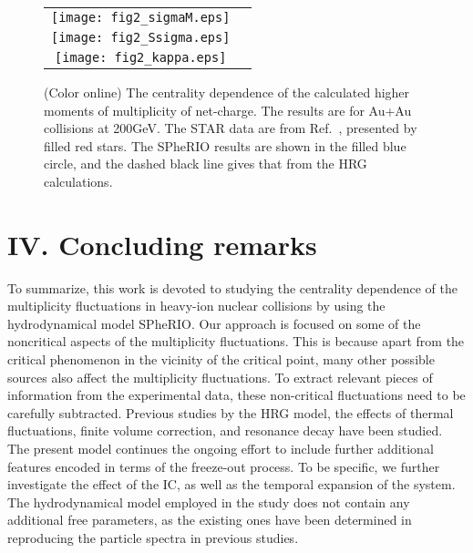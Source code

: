 \documentclass[secnumarabic, graphics,floatfix, nofootinbib,tightenlines,nobibnotes, aps, prl, 12pt]{revtex4-1}
\begin{document}
\begin{figure}[htb]
\begin{tabular}{cc}
\begin{minipage}{300pt}
\centerline{\texttt{[image: fig2\_sigmaM.eps]}}
\end{minipage}
\\
\begin{minipage}{300pt}
\centerline{\texttt{[image: fig2\_Ssigma.eps]}}
\end{minipage}
\\
\begin{minipage}{300pt}
\centerline{\texttt{[image: fig2\_kappa.eps]}}
\end{minipage}
\end{tabular}
\caption{(Color online) The centrality dependence of the calculated higher moments of multiplicity of net-charge.
The results are for Au+Au collisions at 200GeV. 
The STAR data are from Ref.~\cite{RHIC-star-mul-fluctuations-04}, presented by filled red stars. 
The SPheRIO results are shown in the filled blue circle, and the dashed black line gives that from the HRG calculations.
}\label{fpratios}
\end{figure}

\section{IV. Concluding remarks}

To summarize, this work is devoted to studying the centrality dependence of the multiplicity fluctuations in heavy-ion nuclear collisions by using the hydrodynamical model SPheRIO.
Our approach is focused on some of the noncritical aspects of the multiplicity fluctuations.
This is because apart from the critical phenomenon in the vicinity of the critical point, many other possible sources also affect the multiplicity fluctuations.
To extract relevant pieces of information from the experimental data, these non-critical fluctuations need to be carefully subtracted.
Previous studies by the HRG model, the effects of thermal fluctuations, finite volume correction, and resonance decay have been studied.   
The present model continues the ongoing effort to include further additional features encoded in terms of the freeze-out process. 
To be specific, we further investigate the effect of the IC, as well as the temporal expansion of the system.
The hydrodynamical model employed in the study does not contain any additional free parameters, as the existing ones have been determined in reproducing the particle spectra in previous studies.
\end{document}
